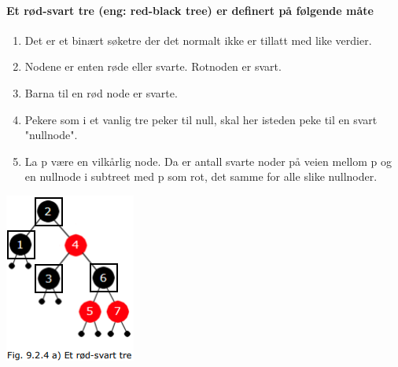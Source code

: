\documentclass[11pt]{article}
\begin{document}
        \paragraph{Et rød-svart tre (eng: red-black tree) er definert på følgende måte}
        \begin{multicols}{2}
            \begin{enumerate}
                \item Det er et binært søketre der det normalt ikke er tillatt med like verdier.
                \item Nodene er enten røde eller svarte. Rotnoden er svart.
                \item Barna til en rød node er svarte.
                \item Pekere som i et vanlig tre peker til null, skal her isteden peke til en svart "nullnode".
                \item La p være en vilkårlig node. Da er antall svarte noder på veien mellom p og en nullnode
                    i subtreet med p som rot, det samme for alle slike nullnoder.
            \end{enumerate}

            \columnbreak

            \includegraphics[scale=0.8, center]{figur-9.2.4a.png}
        \end{multicols}
\end{document}
